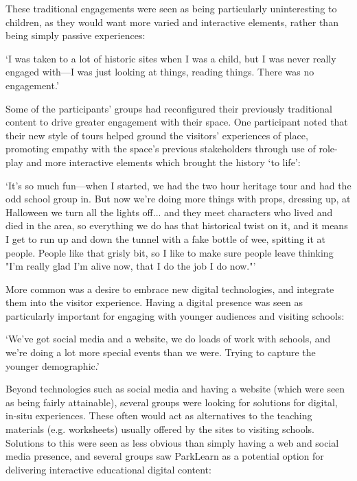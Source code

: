 These traditional engagements were seen as being particularly uninteresting to children, as they would want more varied and interactive elements, rather than being simply passive experiences:

\begin{displayquote}
`I was taken to a lot of historic sites when I was a child, but I was never really engaged with---I was just looking at things, reading things. There was no engagement.'
\end{displayquote}

Some of the participants' groups had reconfigured their previously traditional content to drive greater engagement with their space. One participant noted that their new style of tours helped ground the visitors' experiences of place, promoting empathy with the space's previous stakeholders through use of role-play and more interactive elements which brought the history `to life':

\begin{displayquote}
`It's so much fun---when I started, we had the two hour heritage tour and had the odd school group in. But now we're doing more things with props, dressing up, at Halloween we turn all the lights off... and they meet characters who lived and died in the area, so everything we do has that historical twist on it, and it means I get to run up and down the tunnel with a fake bottle of wee, spitting it at people. People like that grisly bit, so I like to make sure people leave thinking "I'm really glad I'm alive now, that I do the job I do now."'
\end{displayquote}

More common was a desire to embrace new digital technologies, and integrate them into the visitor experience. Having a digital presence was seen as particularly important for engaging with younger audiences and visiting schools:

\begin{displayquote}
`We've got social media and a website, we do loads of work with schools, and we're doing a lot more special events than we were. Trying to capture the younger demographic.'
\end{displayquote}

Beyond technologies such as social media and having a website (which were seen as being fairly attainable), several groups were looking for solutions for digital, in-situ experiences. These often would act as alternatives to the teaching materials (e.g. worksheets) usually offered by the sites to visiting schools. Solutions to this were seen as less obvious than simply having a web and social media presence, and several groups saw ParkLearn as a potential option for delivering interactive educational digital content:

